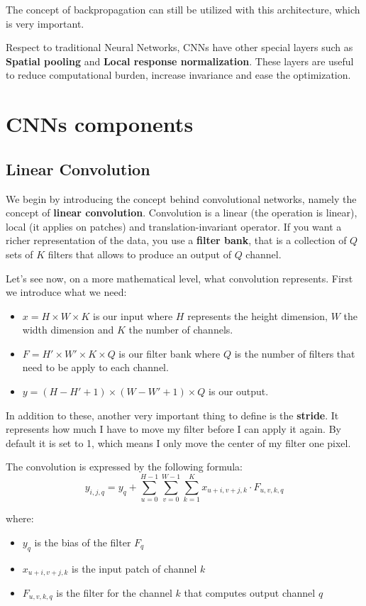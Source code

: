 The concept of backpropagation can still be utilized with this architecture, which is 
very important.

Respect to traditional Neural Networks, CNNs have other special layers such as \textbf{Spatial pooling} and \textbf{Local response normalization}. These layers are 
useful to reduce computational burden, increase invariance and ease the optimization.
\section{CNNs components}
\subsection{Linear Convolution}
We begin by introducing the concept behind convolutional networks, namely the concept 
of \textbf{linear convolution}. Convolution is a linear (the operation is linear), 
local (it applies on patches) and translation-invariant
operator. If you want a richer representation of the data, you use a \textbf{filter bank},
that is a collection of $Q$ sets of $K$ filters that allows to produce an output of 
$Q$ channel.

Let's see now, on a more mathematical level, what convolution represents. First we 
introduce what we need:
\begin{itemize}
    \item $x = H \times W \times K$ is our input where $H$ represents the height dimension, $W$ the width dimension and $K$ the number of channels.
    \item $F = H' \times W' \times K \times Q$ is our filter bank where $Q$ is the number of filters that need to be apply to each channel.
    \item $y = (H - H' + 1) \times (W - W' + 1) \times Q$ is our output.
\end{itemize}

In addition to these, another very important thing to define is the \textbf{stride}. 
It represents how much I have to move my filter before I can apply it again. By default 
it is set to 1, which means I only move the center of my filter one pixel. 

The convolution is expressed by the following formula:
\begin{equation}
    y_{i, j, q} = y_q + \sum_{u = 0}^{H - 1}\sum_{v = 0}^{W - 1}\sum_{k = 1}^{K} x_{u + i, v + j, k} \cdot F_{u, v, k, q} 
\end{equation}

where:
\begin{itemize}
    \item $y_q$ is the bias of the filter $F_q$
    \item $x_{u + i, v + j, k}$ is the input patch of channel $k$
    \item $F_{u, v, k, q}$ is the filter for the channel $k$ that computes output channel $q$ 
\end{itemize}

